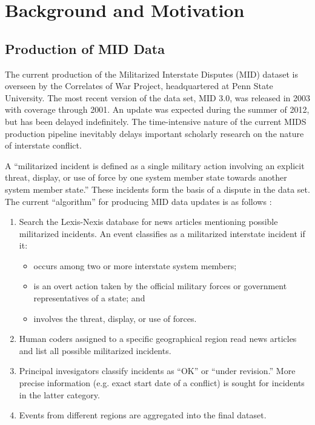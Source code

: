 \documentclass[12pt,letterpaper]{article}
\begin{document}
\section{Background and Motivation} %
\label{lit}

\subsection{Production of MID Data}

The current production of the Militarized Interstate Disputes (MID) dataset is overseen by the Correlates of War Project, headquartered at Penn State University. The most recent version of the data set, MID 3.0, was released in 2003 with coverage through 2001. An update was expected during the summer of 2012, but has been delayed indefinitely. The time-intensive nature of the current MIDS production pipeline inevitably delays important scholarly research on the nature of interstate conflict. 

A ``militarized incident is defined as a single military action involving an explicit threat, display, or use of force by one system member state towards another system member state.'' These incidents form the basis of a dispute in the data set. The current ``algorithm'' for producing MID data updates is as follows \citep{ghosn2004mid3}:

\begin{enumerate}
\item Search the Lexis-Nexis database for news articles mentioning possible militarized incidents. An event classifies as a militarized interstate incident if it:
	\begin{itemize}
		\item occurs among two or more interstate system members;
		\item is an overt action taken by the official military forces or government representatives of a state; and
		\item involves the threat, display, or use of forces.
	\end{itemize}
\item Human coders assigned to a specific geographical region read news articles and list all possible militarized incidents.
\item Principal invesigators classify incidents as ``OK'' or ``under revision.'' More precise information (e.g. exact start date of a conflict) is sought for incidents in the latter category.
\item Events from different regions are aggregated into the final dataset. 
\end{enumerate}
\end{document}
